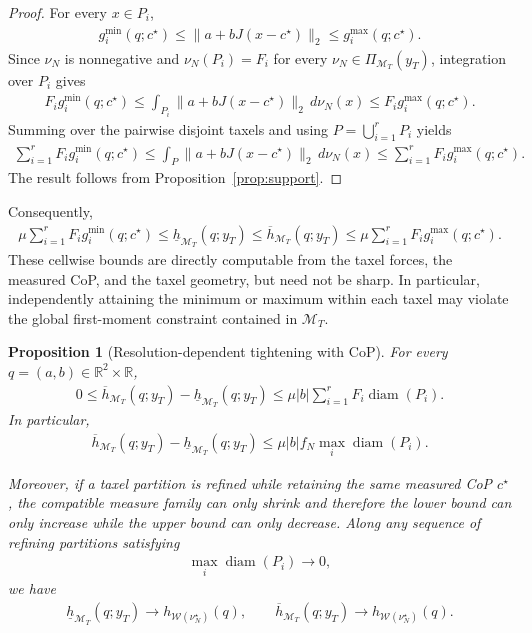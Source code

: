 \documentclass[11pt,a4paper]{article}
\theoremstyle{proposition}
\newtheorem{proposition}[theorem]{Proposition}
\begin{document}
\begin{proof}
For every $x\in P_i$,
\begin{align}
g_i^{\min}(q;c^\star)
\le
\|a+bJ(x-c^\star)\|_2
\le
g_i^{\max}(q;c^\star).
\end{align}
Since $\nu_N$ is nonnegative and
$\nu_N(P_i)=F_i$ for every
$\nu_N\in\Pi_{\mathcal M_T}(y_T)$, integration over $P_i$ gives
\begin{align}
F_i g_i^{\min}(q;c^\star)
\le
\int_{P_i}
\|a+bJ(x-c^\star)\|_2\,d\nu_N(x)
\le
F_i g_i^{\max}(q;c^\star).
\end{align}
Summing over the pairwise disjoint taxels and using
$P=\bigcup_{i=1}^rP_i$ yields
\begin{align}
\sum_{i=1}^rF_i g_i^{\min}(q;c^\star)
\le
\int_P
\|a+bJ(x-c^\star)\|_2\,d\nu_N(x)
\le
\sum_{i=1}^rF_i g_i^{\max}(q;c^\star).
\end{align}
The result follows from Proposition~\ref{prop:support}.
\end{proof}

Consequently,
\begin{align}
\boxed{
\mu\sum_{i=1}^r F_i g_i^{\min}(q;c^\star)
\le
\underline h_{\mathcal M_T}(q;y_T)
\le
\overline h_{\mathcal M_T}(q;y_T)
\le
\mu\sum_{i=1}^r F_i g_i^{\max}(q;c^\star).
}
\end{align}
These cellwise bounds are directly computable from the taxel forces, the
measured CoP, and the taxel geometry, but need not be sharp. In particular,
independently attaining the minimum or maximum within each taxel may violate
the global first-moment constraint contained in $\mathcal M_T$.

\begin{proposition}[Resolution-dependent tightening with CoP]
\label{prop:taxel_resolution_MT}
For every $q=(a,b)\in\mathbb R^2\times\mathbb R$,
\begin{align}
\boxed{
0
\le
\overline h_{\mathcal M_T}(q;y_T)
-
\underline h_{\mathcal M_T}(q;y_T)
\le
\mu |b|
\sum_{i=1}^r
F_i\operatorname{diam}(P_i).
}
\end{align}
In particular,
\begin{align}
\overline h_{\mathcal M_T}(q;y_T)
-
\underline h_{\mathcal M_T}(q;y_T)
\le
\mu |b| f_N
\max_i\operatorname{diam}(P_i).
\end{align}

Moreover, if a taxel partition is refined while retaining the same measured
CoP $c^\star$, the compatible measure family can only shrink and therefore the
lower bound can only increase while the upper bound can only decrease. Along
any sequence of refining partitions satisfying
\begin{align}
\max_i\operatorname{diam}(P_i)\rightarrow0,
\end{align}
we have
\begin{align}
\underline h_{\mathcal M_T}(q;y_T)
\rightarrow
h_{\mathcal W(\nu_N^\star)}(q),
\qquad
\overline h_{\mathcal M_T}(q;y_T)
\rightarrow
h_{\mathcal W(\nu_N^\star)}(q).
\end{align}
\end{proposition}
\end{document}
